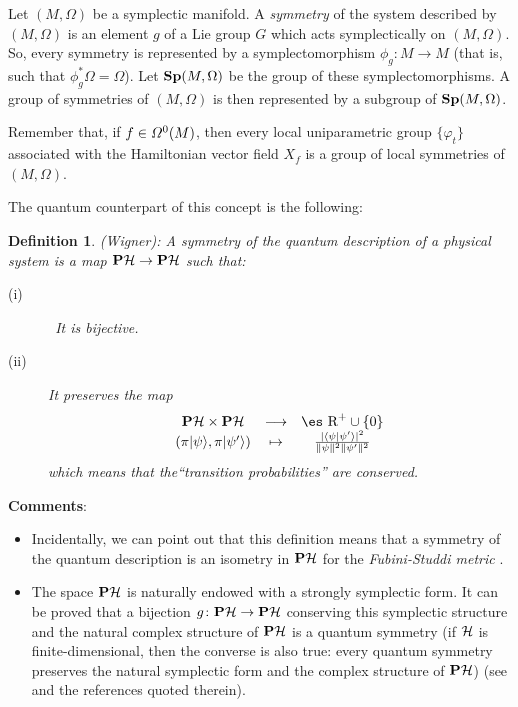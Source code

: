 \documentclass[12pt]{article}
\theoremstyle{plain}
\newtheorem{definition}{Definition}
\def\H{{\cal H}}
\def\sta{|\psi \rangle }
\def\Real{\mbox{\es R}}
\begin{document}
Let $(M,\Omega )$ be a symplectic manifold.
A {\it symmetry} of the system described by $(M,\Omega )$
is an element $g$ of a Lie group $G$ which acts symplectically on
$(M,\Omega )$.
So, every symmetry is represented by a symplectomorphism
$\phi_g \colon M \to M$ (that is, such that $\phi_g^*\Omega =\Omega$).
Let ${\bf Sp}(M,\Omega )$ be the group of these symplectomorphisms.
A group of symmetries of $(M,\Omega )$ is then represented
by a subgroup of ${\bf Sp}(M,\Omega )$.

Remember that, if $f \in {\mit\Omega}^0(M)$,
then every local uniparametric group $\{ \varphi_t \}$
associated with the Hamiltonian vector field $X_f$
is a group of local symmetries of $(M,\Omega )$.

The quantum counterpart of this concept is the following:

\begin{definition}
{\rm (Wigner):}
A {\rm symmetry} of the quantum description of a physical system is a
map
${\bf P}\H \to {\bf P}\H$ such that:
\begin{description}
\item[{\rm (i)}] \
It is  bijective.
\item[{\rm (ii)}]
It preserves the map
$$
\begin{array}{ccc}
{\bf P}\H \times {\bf P}\H & \longrightarrow & \Real^+ \cup \{ 0 \}
\\
(\pi \sta , \pi |\psi '\rangle ) & \mapsto &
\frac{\mid \langle \psi | \psi '\rangle \mid^2}
{\| \psi \|^2 \| \psi '\|^2}
\end{array}
$$
which means that the``transition probabilities'' are conserved.
\end{description}
\label{qsym}
\end{definition}
%
\goodbreak
{\bf Comments}:
\begin{itemize}
\item
Incidentally, we can point out that
this definition means that a symmetry of the quantum description
is an isometry in ${\bf P}\H$ for the {\it Fubini-Studdi metric}
\cite{Wl-85}.
\item
The space ${\bf P}\H$ is naturally endowed with a strongly symplectic
form.
It can be proved that a bijection $g \colon {\bf P}\H \to {\bf P}\H$
conserving this symplectic structure and the natural complex
structure of ${\bf P}\H$ is a quantum symmetry
(if $\H$ is finite-dimensional, then the converse is also true:
every quantum symmetry preserves the natural symplectic form
and the complex structure of ${\bf P}\H$)
(see \cite{Tu-87} and the references quoted therein).
\end{itemize}
\end{document}
